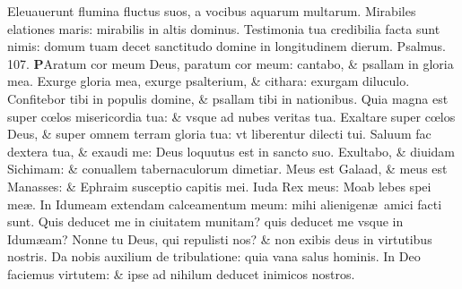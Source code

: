 \documentclass[a5paper,10pt]{book}
\def\ae{æ}
\def\oe{œ}
\begin{document}
\begin{multicols*}{2}
\newline \color{red} E\color{black}leuauerunt flumina fluctus suos, a vocibus aquarum multarum.
\newline \color{red} M\color{black}irabiles elationes maris: mirabilis in altis dominus.
\newline \color{red} T\color{black}estimonia tua credibilia facta sunt nimis: domum tuam decet sanctitudo domine in longitudinem dierum.
\newline \color{red} Psalmus. \hypertarget{ps107}{107.} \color{black}
\vspace{-.25em}
\lettrine[lines=2]{\bfseries \color{red} P}{}Aratum cor meum Deus, paratum cor meum: cantabo, \& psallam in gloria mea.
\newline \color{red} E\color{black}xurge gloria mea, exurge psalterium, \& cithara: exurgam diluculo.
\newline \color{red} C\color{black}onfitebor tibi in populis domine, \& psallam tibi in nationibus.
\newline \color{red} Q\color{black}uia magna est super c\oe los misericordia tua: \& vsque ad nubes veritas tua.
\newline \color{red} E\color{black}xaltare super c\oe los Deus, \& super omnem terram gloria tua: vt liberentur dilecti tui.
\newline \color{red} S\color{black}aluum fac dextera tua, \& exaudi me: Deus loquutus est in sancto suo.
\newline \color{red} E\color{black}xultabo, \& diuidam Sichimam: \& conuallem tabernaculorum dimetiar.
\newline \color{red} M\color{black}eus est Galaad, \& meus est Manasses: \& Ephraim susceptio capitis mei.
\newline \color{red} I\color{black}uda Rex meus: Moab lebes spei me\ae .
\newline \color{red} I\color{black}n Idumeam extendam calceamentum meum: mihi alienigen\ae \ amici facti sunt.
\newline \color{red} Q\color{black}uis deducet me in ciuitatem munitam? quis deducet me vsque in Idum\ae am?
\newline \color{red} N\color{black}onne tu Deus, qui repulisti nos? \& non exibis deus in virtutibus nostris.
\newline \color{red} D\color{black}a nobis auxilium de tribulatione: quia vana salus hominis.
\newline \color{red} I\color{black}n Deo faciemus virtutem: \& ipse ad nihilum deducet inimicos nostros.

\end{multicols*}
\end{document}

